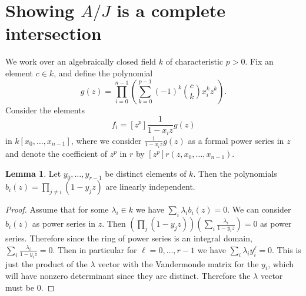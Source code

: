 \documentclass{amsart}
\theoremstyle{definition}
\newtheorem{lemma}[thm]{Lemma}
\begin{document}
\section{Showing $A/J$ is a complete intersection} 

We work over an algebraically closed field $k$ of characteristic $p > 0$.  Fix an element $c \in k$, and define the polynomial
\[
g(z) = \prod_{i = 0}^{n - 1} \left(\sum_{k = 0}^{p - 1} (-1)^k\binom{c}{k} x_i^k z^k\right).
\]
Consider the elements 
\[
f_i = [z^p] \frac{1}{1 - x_i z} g(z)
\]
in $k[x_0, \ldots, x_{n-1}]$, where we consider $\frac{1}{1 - x_i z} g(z)$ as a formal power series in $z$ and denote the coefficient of $z^p$ in $r$ by $[z^p] r(z, x_0, \ldots, x_{n - 1})$.

\begin{lemma} \label{lem:lin-indep}
Let $y_0, \ldots, y_{r - 1}$ be distinct elements of $k$.  Then the polynomials $b_i(z) = \prod_{j \neq i} (1 - y_j z)$ are linearly independent.
\end{lemma}
\begin{proof} %

Assume that for some $\lambda_i \in k$ we have $\sum_i \lambda_ib_i(z)=0$. We can consider $b_i(z)$ as power series in $z$. Then $\left(\prod_j (1-y_jz)\right)\left(\sum_i \frac{\lambda_i}{1-y_iz}\right)=0$ as power series. Therefore since the ring of power series is an integral domain, $\sum_i \frac{\lambda_i}{1-y_iz}=0$. Then in particular for $\ell=0,\dots,r-1$ we have $\sum_i \lambda_iy_i^\ell=0$. This is just the product of the $\lambda$ vector with the Vandermonde matrix for the $y_i$, which will have nonzero determinant since they are distinct. Therefore the $\lambda$ vector must be $0$.
\end{proof}
\end{document}
